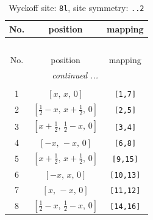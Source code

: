 \documentclass[fleqn,8pt]{jsarticle}
\begin{document}
\begin{longtable}{ccc}
\caption{Wyckoff site: {\tt 8l}, site symmetry: {\tt ..2}}
 \\
 \hline \hline
No. & position & mapping \\ \hline \endfirsthead

\multicolumn{2}{l}{\tablename\ \thetable{}} \\
 \hline \hline
No. & position & mapping \\ \hline \endhead

 \hline \hline
\multicolumn{2}{r}{\footnotesize\it continued ...} \\ \endfoot

 \hline \hline
\multicolumn{2}{r}{} \\ \endlastfoot

1 & $\left[ x,\, x,\, 0 \right]$ & {\tt [1,7]} \\ \hline
2 & $\left[ \frac{1}{2} - x,\, x + \frac{1}{2},\, 0 \right]$ & {\tt [2,5]} \\ \hline
3 & $\left[ x + \frac{1}{2},\, \frac{1}{2} - x,\, 0 \right]$ & {\tt [3,4]} \\ \hline
4 & $\left[ - x,\, - x,\, 0 \right]$ & {\tt [6,8]} \\ \hline
5 & $\left[ x + \frac{1}{2},\, x + \frac{1}{2},\, 0 \right]$ & {\tt [9,15]} \\ \hline
6 & $\left[ - x,\, x,\, 0 \right]$ & {\tt [10,13]} \\ \hline
7 & $\left[ x,\, - x,\, 0 \right]$ & {\tt [11,12]} \\ \hline
8 & $\left[ \frac{1}{2} - x,\, \frac{1}{2} - x,\, 0 \right]$ & {\tt [14,16]} \\
\end{longtable}
\renewcommand{\arraystretch}{1.2}
\end{document}
